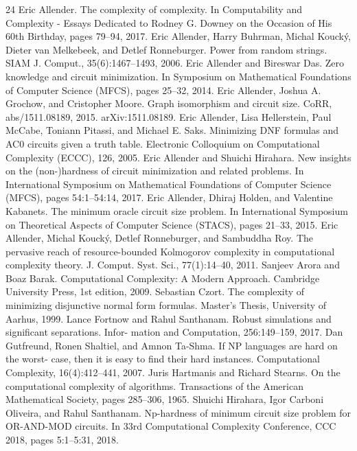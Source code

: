 \begin{thebibliography}{24}
Eric Allender. The complexity of complexity. In Computability and Complexity - Essays Dedicated to Rodney G. Downey on the Occasion of His 60th Birthday, pages 79–94, 2017.
Eric Allender, Harry Buhrman, Michal Koucký, Dieter van Melkebeek, and Detlef Ronneburger. Power from random strings. SIAM J. Comput., 35(6):1467–1493, 2006.
Eric Allender and Bireswar Das. Zero knowledge and circuit minimization. In Symposium on Mathematical Foundations of Computer Science (MFCS), pages 25–32, 2014.
Eric Allender, Joshua A. Grochow, and Cristopher Moore. Graph isomorphism and circuit size. CoRR, abs/1511.08189, 2015. arXiv:1511.08189.
Eric Allender, Lisa Hellerstein, Paul McCabe, Toniann Pitassi, and Michael E. Saks. Minimizing DNF formulas and AC0 circuits given a truth table. Electronic Colloquium on Computational Complexity (ECCC), 126, 2005.
Eric Allender and Shuichi Hirahara. New insights on the (non-)hardness of circuit minimization and related problems. In International Symposium on Mathematical Foundations of Computer Science (MFCS), pages 54:1–54:14, 2017.
Eric Allender, Dhiraj Holden, and Valentine Kabanets. The minimum oracle circuit size problem. In International Symposium on Theoretical Aspects of Computer Science (STACS), pages 21–33, 2015.
Eric Allender, Michal Koucký, Detlef Ronneburger, and Sambuddha Roy. The pervasive reach of resource-bounded Kolmogorov complexity in computational complexity theory. J. Comput. Syst. Sci., 77(1):14–40, 2011.
Sanjeev Arora and Boaz Barak. Computational Complexity: A Modern Approach. Cambridge University Press, 1st edition, 2009.
Sebastian Czort. The complexity of minimizing disjunctive normal form formulas. Master’s Thesis, University of Aarhus, 1999.
Lance Fortnow and Rahul Santhanam. Robust simulations and significant separations. Infor- mation and Computation, 256:149–159, 2017.
Dan Gutfreund, Ronen Shaltiel, and Amnon Ta-Shma. If NP languages are hard on the worst- case, then it is easy to find their hard instances. Computational Complexity, 16(4):412–441, 2007.
Juris Hartmanis and Richard Stearns. On the computational complexity of algorithms. Transactions of the American Mathematical Society, pages 285–306, 1965.
Shuichi Hirahara, Igor Carboni Oliveira, and Rahul Santhanam. Np-hardness of minimum circuit size problem for OR-AND-MOD circuits. In 33rd Computational Complexity Conference, CCC 2018, pages 5:1–5:31, 2018.

\end{thebibliography}
